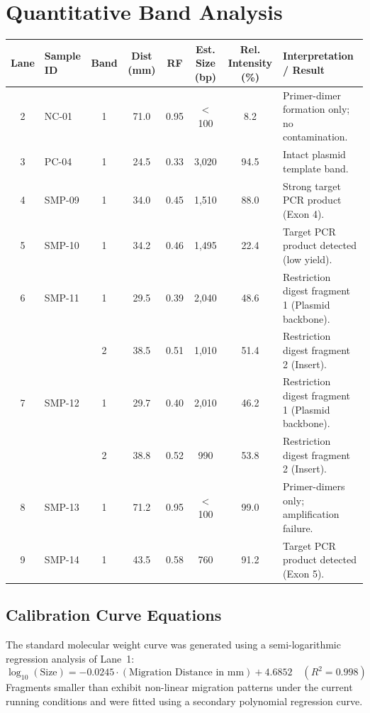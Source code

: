 \section{Quantitative Band Analysis}
\label{sec:band_analysis}

\begin{tabularx}{\textwidth}{c l c c c c c X}
\toprule
\textbf{Lane} & \textbf{Sample ID} & \textbf{Band} & \textbf{Dist (mm)} & \textbf{RF} & \textbf{Est. Size (bp)} & \textbf{Rel. Intensity (\%)} & \textbf{Interpretation / Result} \\
\midrule
2 & NC-01   & 1 & 71.0 & 0.95 & < 100  & 8.2  & Primer-dimer formation only; no contamination. \\
\rowcolor{GelRow}
3 & PC-04   & 1 & 24.5 & 0.33 & 3,020  & 94.5 & Intact plasmid template band. \\
4 & SMP-09  & 1 & 34.0 & 0.45 & 1,510  & 88.0 & Strong target PCR product (Exon 4). \\
\rowcolor{GelRow}
5 & SMP-10  & 1 & 34.2 & 0.46 & 1,495  & 22.4 & Target PCR product detected (low yield). \\
6 & SMP-11  & 1 & 29.5 & 0.39 & 2,040  & 48.6 & Restriction digest fragment 1 (Plasmid backbone). \\
\rowcolor{GelRow}
  &         & 2 & 38.5 & 0.51 & 1,010  & 51.4 & Restriction digest fragment 2 (Insert). \\
7 & SMP-12  & 1 & 29.7 & 0.40 & 2,010  & 46.2 & Restriction digest fragment 1 (Plasmid backbone). \\
\rowcolor{GelRow}
  &         & 2 & 38.8 & 0.52 & 990    & 53.8 & Restriction digest fragment 2 (Insert). \\
8 & SMP-13  & 1 & 71.2 & 0.95 & < 100  & 99.0 & Primer-dimers only; amplification failure. \\
\rowcolor{GelRow}
9 & SMP-14  & 1 & 43.5 & 0.58 & 760    & 91.2 & Target PCR product detected (Exon 5). \\
\bottomrule
\end{tabularx}
\vspace{4pt}

\subsection*{Calibration Curve Equations}
The standard molecular weight curve was generated using a semi-logarithmic regression analysis of Lane~1:
\begin{equation}
  \log_{10}(\text{Size}) = -0.0245 \cdot (\text{Migration Distance in mm}) + 4.6852 \quad (R^2 = 0.998)
\end{equation}
Fragments smaller than  exhibit non-linear migration patterns under the current running conditions and were fitted using a secondary polynomial regression curve.
